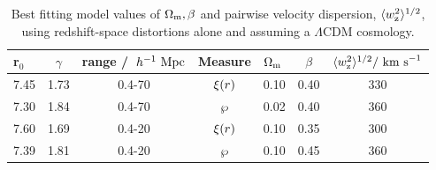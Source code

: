 \documentclass[usenatbib]{mn2e}
\begin{document}
\begin{table}
\centering
\caption{Best fitting model values of $\Omega_{\rm m}, \beta$ and 
pairwise velocity dispersion, $\langle w_{\rm z}^2\rangle^{1/2}$, 
using redshift-space distortions alone and assuming a $\Lambda$CDM cosmology.}
\begin{tabular}{||l|c|c|c|l|c|c} \hline
\hline
r$_{0}$ & $\gamma$ &  range /$~\;h^{-1}~{\rm Mpc}$ & Measure & $\Omega_{\rm m}$ & $\beta$ & $\langle w_{\rm z}^2\rangle^{1/2} / {\rm ~km~s}^{-1}$ \\
\hline
7.45     &  1.73    &  0.4-70        & $\xi(r)$  &   0.10 &  0.40   &  330    \\
7.30     &  1.84    &  0.4-70	     & $\wp $  &   0.02 &  0.40   &  360    \\
7.60     &  1.69    &  0.4-20        & $\xi(r)$  &   0.10 &  0.35   &  300    \\
7.39     &  1.81    &  0.4-20        & $\wp$   &   0.10 &  0.45   &  360    \\
\hline
\end{tabular}
\label{tab:zspace_dist_values}
\end{table}









\end{document}
